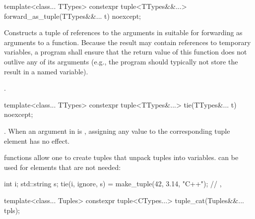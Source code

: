 %
%
\begin{itemdecl}
template<class... TTypes>
  constexpr tuple<TTypes&&...> forward_as_tuple(TTypes&&... t) noexcept;
\end{itemdecl}

\begin{itemdescr}
\pnum
\effects Constructs a tuple of references to the arguments in  suitable
for forwarding as arguments to a function. Because the result may contain references
to temporary variables, a program shall ensure that the return value of this
function does not outlive any of its arguments (e.g., the program should typically
not store the result in a named variable).

\pnum
\returns {}.
\end{itemdescr}

%
%
%
\begin{itemdecl}
template<class... TTypes>
  constexpr tuple<TTypes&...> tie(TTypes&... t) noexcept;
\end{itemdecl}

\begin{itemdescr}
\pnum
\returns {}.  When an
argument in  is , assigning
any value to the corresponding tuple element has no effect.

\pnum
\begin{example}
 functions allow one to create tuples that unpack
tuples into variables.  can be used for elements that
are not needed:
\begin{codeblock}
int i; std::string s;
tie(i, ignore, s) = make_tuple(42, 3.14, "C++");
// , 
\end{codeblock}
\end{example}
\end{itemdescr}

\begin{itemdecl}
template<class... Tuples>
  constexpr tuple<CTypes...> tuple_cat(Tuples&&... tpls);
\end{itemdecl}

